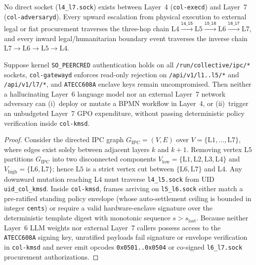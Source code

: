 \begin{definition}
\label{def:ch1-three-hop-uturn}
No direct socket (\texttt{l4\_l7.sock}) exists between Layer~4 (\texttt{col-execd}) and Layer~7
(\texttt{col-adversaryd}). Every upward escalation from physical execution to external legal or
fiat procurement traverses the three-hop chain
$\mathrm{L4} \xrightarrow{\mathtt{l4\_l5}} \mathrm{L5} \xrightarrow{\mathtt{l5\_l6}} \mathrm{L6} \xrightarrow{\mathtt{l6\_l7}} \mathrm{L7}$,
and every inward legal/humanitarian boundary event traverses the inverse chain
$\mathrm{L7} \to \mathrm{L6} \to \mathrm{L5} \to \mathrm{L4}$.
\end{definition}

\begin{theorem}
\label{thm:ch1-unratified-mutation}
Suppose kernel \texttt{SO\_PEERCRED} authentication holds on all \texttt{/run/collective/ipc/*}
sockets, \texttt{col-gatewayd} enforces read-only rejection on \texttt{/api/v1/l1..l5/*} and
\texttt{/api/v1/l7/*}, and \texttt{ATECC608A} enclave keys remain uncompromised. Then neither a
hallucinating Layer~6 language model nor an external Layer~7 network adversary can (i)~deploy or
mutate a BPMN workflow in Layer~4, or (ii)~trigger an unbudgeted Layer~7 GPO expenditure,
without passing deterministic policy verification inside \texttt{col-kmsd}.
\end{theorem}

\begin{proof}
Consider the directed IPC graph $G_{\mathrm{IPC}} = (V, E)$ over $V = \{\mathrm{L1}, \dots,
\mathrm{L7}\}$, where edges exist solely between adjacent layers $k$ and $k+1$. Removing vertex
$\mathrm{L5}$ partitions $G_{\mathrm{IPC}}$ into two disconnected components
$V_{\mathrm{low}} = \{\mathrm{L1}, \mathrm{L2}, \mathrm{L3}, \mathrm{L4}\}$ and
$V_{\mathrm{high}} = \{\mathrm{L6}, \mathrm{L7}\}$; hence $\mathrm{L5}$ is a strict vertex cut
between $\{\mathrm{L6}, \mathrm{L7}\}$ and $\mathrm{L4}$. Any downward mutation reaching
$\mathrm{L4}$ must traverse \texttt{l4\_l5.sock} from UID \texttt{uid\_col\_kmsd}. Inside
\texttt{col-kmsd}, frames arriving on \texttt{l5\_l6.sock} either match a pre-ratified standing
policy envelope (whose auto-settlement ceiling is bounded in integer \texttt{cents}) or require
a valid hardware-enclave signature over the deterministic template digest with monotonic
sequence $s > s_{\mathrm{last}}$. Because neither Layer~6 LLM weights nor external Layer~7
callers possess access to the \texttt{ATECC608A} signing key, unratified payloads fail signature
or envelope verification in \texttt{col-kmsd} and never emit opcodes \texttt{0x0501..0x0504} or
co-signed \texttt{l6\_l7.sock} procurement authorizations.
\end{proof}


